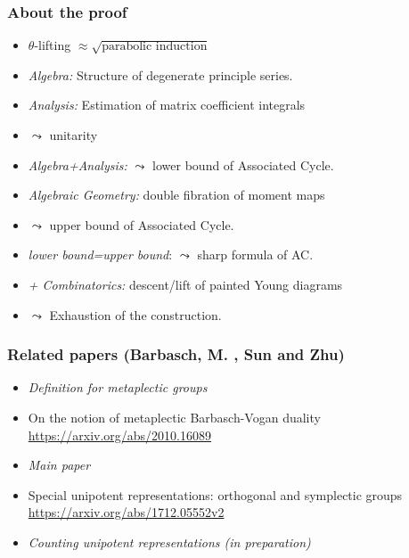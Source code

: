 \documentclass[t,11pt,usenames,dvipsnames]{beamer}
\theoremstyle{plain}
\theoremstyle{definition}
\def\blue{\color{blue}}
\let\oldemph\emph
\def\emph#1{\oldemph{\blue #1}}
\begin{document}
    \begin{frame}
      \frametitle{About the proof}
      \begin{itemize}[<+->]
        \item $\theta$-lifting $\approx \sqrt{\text{parabolic induction}}$
        \item \emph{Algebra: } Structure of degenerate principle series.
        \item \emph{Analysis:} Estimation of matrix coefficient integrals
        \item[] $\leadsto$ unitarity
        \item \emph{Algebra+Analysis: } $\leadsto$ lower bound of Associated Cycle.
        \item \emph{Algebraic Geometry:} double fibration of moment maps
        \item[] $\leadsto$ upper bound of Associated Cycle.
        \item \emph{lower bound=upper bound}: $\leadsto$ sharp formula of AC.
        \item \emph{+ Combinatorics: } descent/lift of painted Young diagrams
        \item[] $\leadsto$ Exhaustion of the construction.
      \end{itemize}
    \end{frame}

    \begin{frame}
      \frametitle{Related papers (Barbasch, M. ,  Sun and  Zhu)}
        \vfill
        \begin{itemize}
          \item \emph{Definition for metaplectic groups}
          \item[]
   	On the notion of metaplectic Barbasch-Vogan duality
        \href{https://arxiv.org/abs/2010.16089}{https://arxiv.org/abs/2010.16089}
          \item \emph{Main paper}
          \item[]
        Special unipotent representations: orthogonal and symplectic groups\\
        \href{https://arxiv.org/abs/1712.05552v2}{https://arxiv.org/abs/1712.05552v2}
          \item \emph{Counting unipotent representations (in preparation)}
        \vfill
         \end{itemize}
    \end{frame}
\end{document}
